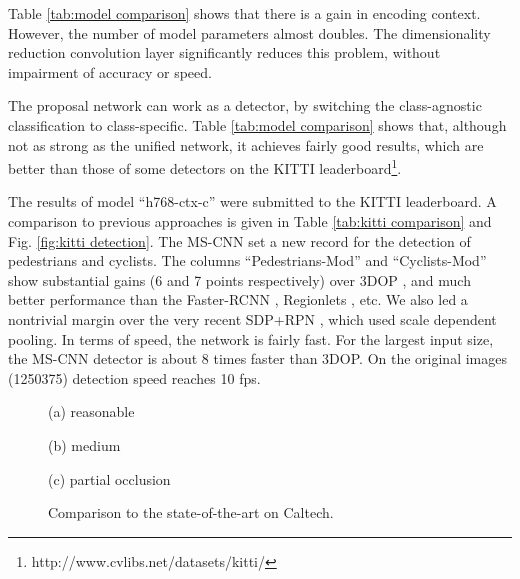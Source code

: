 \documentclass[runningheads]{llncs}
\begin{document}
Table \ref{tab:model comparison} shows that there is a gain in encoding
context. However, the number of model parameters almost doubles. The
dimensionality reduction convolution layer significantly reduces
this problem, without impairment of accuracy or speed.

The proposal network can work as a detector, by switching the class-agnostic classification to class-specific. Table \ref{tab:model comparison}
shows that, although not as strong as the unified network, it achieves fairly good results, which are better than those of some detectors on the KITTI leaderboard\footnote{http://www.cvlibs.net/datasets/kitti/}.


The results of model ``h768-ctx-c'' were submitted to the KITTI leaderboard. A comparison
to previous approaches is given in Table \ref{tab:kitti comparison} and
Fig. \ref{fig:kitti detection}. The MS-CNN set a new record
for the detection of pedestrians and cyclists. The columns ``Pedestrians-Mod'' and ``Cyclists-Mod''
show substantial gains (6 and 7 points respectively) over
3DOP \cite{DBLP:conf/nips/XiaozhiNIPS15}, and much better performance
than the Faster-RCNN \cite{DBLP:conf/nips/shaoqing15fasterRcnn},
Regionlets \cite{DBLP:conf/iccv/WangYZL13}, etc. We also led a nontrivial margin over the very recent SDP+RPN \cite{DBLP:conf/cvpr/yang2016sdp}, which used scale dependent pooling. In terms of speed, the network is fairly fast. For the largest input size, the MS-CNN detector is about 8 times faster than 3DOP. On the original images
(1250375) detection speed reaches 10 fps.

\begin{figure*}[!t]
\begin{minipage}[b]{.32\linewidth}
\centering
\centerline{}{(a) reasonable}
\end{minipage}
\hfill
\begin{minipage}[b]{.32\linewidth}
\centering
\centerline{}{(b) medium}
\end{minipage}
\hfill
\begin{minipage}[b]{.32\linewidth}
\centering
\centerline{}{(c) partial occlusion}
\end{minipage}
\caption{Comparison to the state-of-the-art on Caltech.}
\label{fig:caltech}
\end{figure*}
\end{document}
